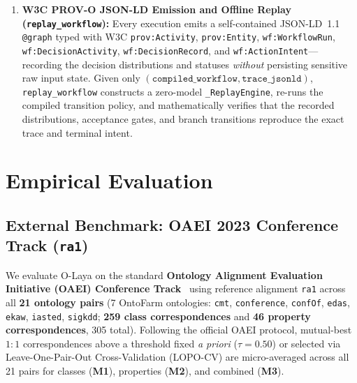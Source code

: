 \documentclass[11pt,a4paper]{article}
\begin{document}
\begin{enumerate}[leftmargin=1.8em,itemsep=0.3em]
  \item \textbf{W3C PROV-O JSON-LD Emission and Offline Replay (\texttt{replay\_workflow}):}
  Every execution emits a self-contained JSON-LD~1.1 \texttt{@graph} typed with W3C \texttt{prov:Activity}, \texttt{prov:Entity}, \texttt{wf:WorkflowRun}, \texttt{wf:DecisionActivity}, \texttt{wf:DecisionRecord}, and \texttt{wf:ActionIntent}---recording the decision distributions and statuses \emph{without} persisting sensitive raw input state. Given only $(\texttt{compiled\_workflow}, \texttt{trace\_jsonld})$, \texttt{replay\_workflow} constructs a zero-model \texttt{\_ReplayEngine}, re-runs the compiled transition policy, and mathematically verifies that the recorded distributions, acceptance gates, and branch transitions reproduce the exact trace and terminal intent.
\end{enumerate}

\section{Empirical Evaluation}
\label{sec:eval}

\subsection{External Benchmark: OAEI 2023 Conference Track (\texttt{ra1})}

We evaluate O-Laya on the standard \textbf{Ontology Alignment Evaluation Initiative (OAEI) Conference Track}~\cite{pour2023oaei} using reference alignment \texttt{ra1} across all \textbf{21 ontology pairs} (7 OntoFarm ontologies: \texttt{cmt}, \texttt{conference}, \texttt{confOf}, \texttt{edas}, \texttt{ekaw}, \texttt{iasted}, \texttt{sigkdd}; \textbf{259 class correspondences} and \textbf{46 property correspondences}, 305 total). Following the official OAEI protocol, mutual-best $1{:}1$ correspondences above a threshold fixed \emph{a priori} ($\tau = 0.50$) or selected via Leave-One-Pair-Out Cross-Validation (LOPO-CV) are micro-averaged across all 21 pairs for classes (\textbf{M1}), properties (\textbf{M2}), and combined (\textbf{M3}).
\end{document}
